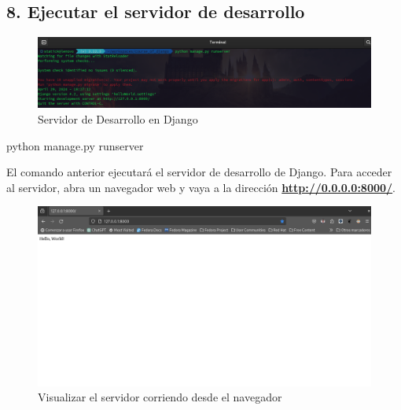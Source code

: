 \documentclass[
  a4paper,
  DIV=11,
  numbers=noendperiod,
  onepage,
  openany]{scrreprt}
\newenvironment{Shaded}{\begin{snugshade}}{\end{snugshade}}
\newcommand{\ExtensionTok}[1]{\textcolor[rgb]{0.00,0.23,0.31}{#1}}
\newcommand{\NormalTok}[1]{\textcolor[rgb]{0.00,0.23,0.31}{#1}}
\begin{document}
\begin{tcolorbox}
\section{8. Ejecutar el servidor de
desarrollo}\label{ejecutar-el-servidor-de-desarrollo}

\begin{figure}[H]

{\centering \includegraphics{images/servidor_desarrollo_django.png}

}

\caption{Servidor de Desarrollo en Django}

\end{figure}%

\begin{Shaded}
\begin{Highlighting}[]
\ExtensionTok{python}\NormalTok{ manage.py runserver}
\end{Highlighting}
\end{Shaded}

El comando anterior ejecutará el servidor de desarrollo de Django. Para
acceder al servidor, abra un navegador web y vaya a la dirección
\textbf{\url{http://0.0.0.0:8000/}}.

\begin{figure}[H]

{\centering \includegraphics{images/navegador_django.png}

}

\caption{Visualizar el servidor corriendo desde el navegador}


\end{figure}
\end{tcolorbox}
\end{document}
